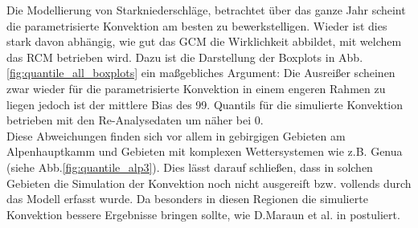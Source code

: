 Die Modellierung von Starkniederschläge, betrachtet über das ganze Jahr scheint die parametrisierte Konvektion am besten zu bewerkstelligen. Wieder ist dies stark davon abhängig, wie gut das GCM die Wirklichkeit abbildet, mit welchem das RCM betrieben wird. Dazu ist die Darstellung der Boxplots in Abb.\ref{fig:quantile_all_boxplots} ein maßgebliches Argument: Die Ausreißer scheinen zwar wieder für die parametrisierte Konvektion in einem engeren Rahmen zu liegen jedoch ist der mittlere Bias des 99. Quantils für die simulierte Konvektion betrieben mit den Re-Analysedaten um näher bei 0.\\
Diese Abweichungen finden sich vor allem in gebirgigen Gebieten am Alpenhauptkamm und  Gebieten mit komplexen Wettersystemen wie z.B. Genua (siehe Abb.\ref{fig:quantile_alp3}). Dies lässt darauf schließen, dass in solchen Gebieten die Simulation der Konvektion noch nicht ausgereift bzw. vollends durch das Modell erfasst wurde. Da besonders in diesen Regionen die simulierte Konvektion bessere Ergebnisse bringen sollte, wie D.Maraun et al. in \cite{maraun_value} postuliert.\vspace{1pt}\\


